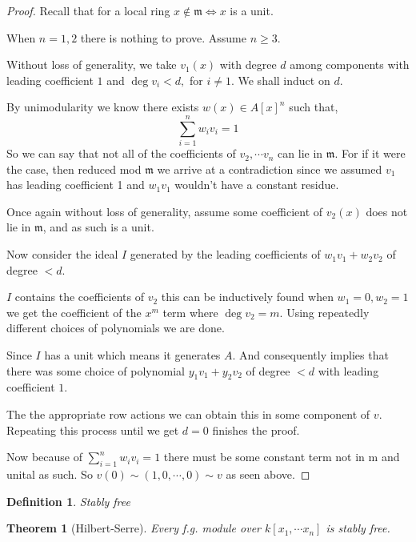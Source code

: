 \documentclass[12pt]{article}
\numberwithin{equation}{section}
\newtheorem{theorem}{Theorem}[section]
\newtheorem{definition}{Definition}[section]
\begin{document}
	\begin{proof}
	Recall that for a local ring $x \not \in \mathfrak m \iff x  $ is a unit.
	
	When $n=1,2 $ there is nothing to prove. Assume $n \geq 3$.
	
	
	Without loss of generality, we take $v_1(x)$ with degree $d $ among components with leading coefficient $1$ and $\deg v_i < d, $ for $i \neq 1$. We shall induct on $d$.
	
	By unimodularity we know there exists $w(x)\in A[x]^n$ such that,
	\[ \sum_{i=1}^n w_i v_i = 1 \]
	So we can say that not all of the coefficients of $v_2, \cdots v_n $ can lie in $\mathfrak m$. For if it were the case, then reduced mod $\mathfrak m$ we arrive at a contradiction since we assumed $v_1 $ has leading coefficient 1 and $w_1v_1$ wouldn't have a constant residue.
	
	Once again without loss of generality, assume some coefficient of $v_2(x)$ does not lie in $\mathfrak m$, and as such is a unit.
	
	Now consider the ideal $I$ generated by the leading coefficients of $w_1v_1+w_2v_2$ of degree $< d.$ 
	
	$I$ contains the coefficients of $v_2$ this can be inductively found when $w_1=0, w_2=1$ we get the coefficient of the $x^m$ term where $\deg v_2 = m$.
	Using repeatedly different choices of polynomials we are done.
	
	Since $I$ has a unit which means it generates $A$. And consequently implies that there was some choice of polynomial $y_1v_1+y_2v_2$ of degree $<d$ with leading coefficient $1$.
	
	The the appropriate row actions we can obtain this in some component of $v$. Repeating this process until we get $d=0$ finishes the proof.
	
	Now because of $\sum_{i=1}^n w_i v_i =1 $ there must be some constant term not in $\mathrm m $ and unital as such. So $v(0) \sim (1,0,\cdots ,0 ) \sim v$ as seen above.
	\end{proof}
	

	
	\begin{definition}
		Stably free
	\end{definition}
	
	\begin{theorem}[Hilbert-Serre]
		 Every f.g. module over $k[x_1,\cdots x_n]$ is stably free.
	\end{theorem}
	
\end{document}
